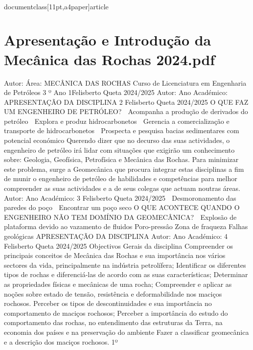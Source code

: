 \\documentclass[11pt,a4paper]{article}
\begin{document}
\clearpage


\section*{Apresentação e Introdução da Mecânica das Rochas 2024.pdf}


Autor:
Área:
MECÂNICA DAS ROCHAS
Curso de Licenciatura em Engenharia de Petróleos
3 º Ano
1Felisberto Queta
2024/2025
Autor:
Ano Académico:
APRESENTAÇÃO DA DISCIPLINA 2
Felisberto Queta
2024/2025
O QUE FAZ UM ENGENHEIRO DE PETRÓLEO? 
 Acompanha 
a produção de derivados 
do petróleo
 Explora e produz 
hidrocarbonetos
 Gerencia a  comercialização 
e transporte de 
hidrocarbonetos
 Prospecta e pesquisa 
bacias sedimentares com 
potencial económico
Querendo dizer que no decurso das suas
actividades, o engenheiro de petróleo irá lidar
com situações que exigirão um conhecimento
sobre:
Geologia, Geofísica, Petrofísica e
Mecânica das Rochas.
Para minimizar este problema, surge a
Geomecânica que procura integrar estas
disciplinas a fim de munir o engenheiro de
petróleo de habilidades e competências para
melhor compreender as suas actividades e a
de seus colegas que actuam noutras áreas.
Autor:
Ano Académico:
3
Felisberto Queta
2024/2025
 Desmoronamento das paredes do poço
 Encontrar um poço seco
O QUE ACONTECE QUANDO O ENGENHEIRO NÃO TEM DOMÍNIO DA GEOMECÂNICA? 
 Explosão de plataforma devido ao 
vazamento de fluidos
Poro-pressâo Zona de 
fraqueza
Falhas 
geológicas
APRESENTAÇÃO DA DISCIPLINA
Autor:
Ano Académico:
4
Felisberto Queta
2024/2025
Objectivos Gerais da disciplina
Compreender os principais conceitos de Mecânica das Rochas e sua importância nos 
vários sectores da vida, principalmente na indústria petrolífera;
Identificar os diferentes tipos de rochas e diferenciá-las de acordo com as suas 
características;
Determinar as propriedades físicas e mecânicas de uma rocha;
Compreender e aplicar as noções sobre estado de tensão,  resistência e 
deformabilidade nos maciços rochosos. 
Perceber os tipos de descontinuidades e sua importância no comportamento de 
maciços rochosos; 
Perceber a importância do estudo do comportamento das rochas, no entendimento 
das estruturas da Terra, na economia dos países e na preservação do ambiente
Fazer a classificar geomecânica e a descrição dos maciços rochosos.
1º
\end{document}
